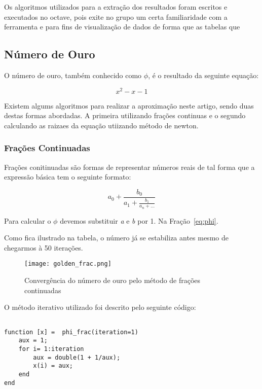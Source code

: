	Os algoritmos utilizados para a extração dos resultados foram escritos e
	executados no octave, pois exite no grupo um certa familiaridade com a
	ferramenta e para fins de visualização de dados de forma que as tabelas que


\subsection{Número de Ouro}

	O número de ouro, também conhecido como $\phi$, é o resultado da seguinte
	equação:

	\begin{equation}
		x^2-x-1
	\end{equation}

	Existem algums algoritmos para realizar a aproximação neste artigo, sendo
	duas destas formas  abordadas. A primeira utilizando frações continuas e o
	segundo calculando as raizaes da equação utiizando método de newton.

\subsubsection{Frações Continuadas}

	Frações conitinuadas são formas de representar números reais de tal forma
	que a expressão básica tem o seguinte formato:

	\begin{equation}\label{eq:phi}
		a_0 + \frac{b_0}{a_1 + \frac{b_1}{a_n + \dots}}
	\end{equation}

	Para calcular o $\phi$ devemos substituir \emph{a} e \emph{b} por 1. Na
	Fração~\ref{eq:phi}.

	

Como fica ilustrado na tabela, o número já se estabiliza antes mesmo de
chegarmos à 50 iterações.

\begin{figure}[H]
    \centering
    \texttt{[image: golden\_frac.png]}
    \caption{Convergência do número de ouro pelo método de frações continuadas}
    \label{golden_frac}
\end{figure}


O método iterativo utilizado foi descrito pelo seguinte código:

\begin{lstlisting}

function [x] =  phi_frac(iteration=1)
	aux = 1;
	for i= 1:iteration
		aux = double(1 + 1/aux);
		x(i) = aux;
	end
end

\end{lstlisting}

